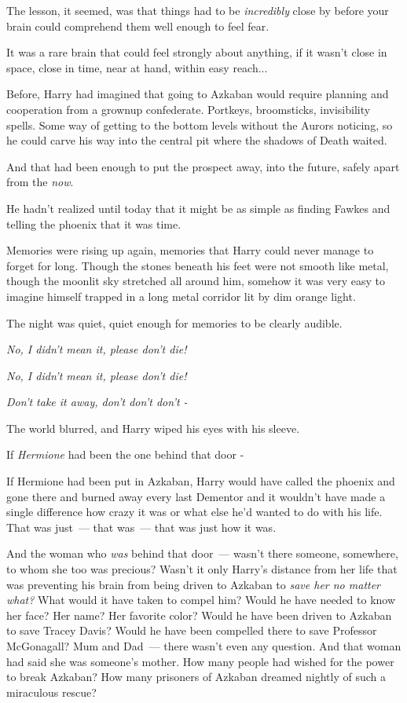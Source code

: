 The lesson, it seemed, was that things had to be \emph{incredibly} close by before your brain could comprehend them well enough to feel fear.

It was a rare brain that could feel strongly about anything, if it wasn't close in space, close in time, near at hand, within easy reach...

Before, Harry had imagined that going to Azkaban would require planning and cooperation from a grownup confederate. Portkeys, broomsticks, invisibility spells. Some way of getting to the bottom levels without the Aurors noticing, so he could carve his way into the central pit where the shadows of Death waited.

And that had been enough to put the prospect away, into the future, safely apart from the \emph{now}.

He hadn't realized until today that it might be as simple as finding Fawkes and telling the phoenix that it was time.

Memories were rising up again, memories that Harry could never manage to forget for long. Though the stones beneath his feet were not smooth like metal, though the moonlit sky stretched all around him, somehow it was very easy to imagine himself trapped in a long metal corridor lit by dim orange light.

The night was quiet, quiet enough for memories to be clearly audible.

\emph{No, I didn't mean it, please don't die!}

\emph{No, I didn't mean it, please don't die!}

\emph{Don't take it away, don't don't don't -}

The world blurred, and Harry wiped his eyes with his sleeve.

If \emph{Hermione} had been the one behind that door -

If Hermione had been put in Azkaban, Harry would have called the phoenix and gone there and burned away every last Dementor and it wouldn't have made a single difference how crazy it was or what else he'd wanted to do with his life. That was just~--- that was~--- that was just how it was.

And the woman who \emph{was} behind that door~--- wasn't there someone, somewhere, to whom she too was precious? Wasn't it only Harry's distance from her life that was preventing his brain from being driven to Azkaban to \emph{save her no matter what?} What would it have taken to compel him? Would he have needed to know her face? Her name? Her favorite color? Would he have been driven to Azkaban to save Tracey Davis? Would he have been compelled there to save Professor McGonagall? Mum and Dad~--- there wasn't even any question. And that woman had said she was someone's mother. How many people had wished for the power to break Azkaban? How many prisoners of Azkaban dreamed nightly of such a miraculous rescue?

